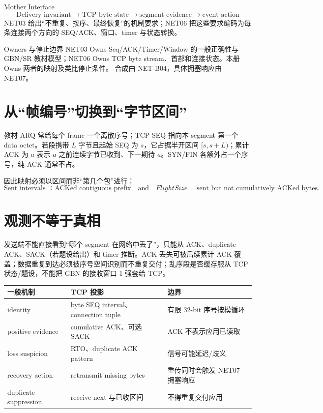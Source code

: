 \documentclass[UTF8,fontset=none,11pt,a4paper]{ctexart}
\begin{document}

\begin{corebox}{Mother Interface}
\[
\boxed{\text{Delivery invariant}\to\text{TCP byte-state}\to\text{segment evidence}\to\text{event action}}
\]
NET03 给出“不重复、按序、最终恢复”的机制要求；NET06 把这些要求编码为每条连接两个方向的 SEQ/ACK、窗口、timer 与状态转换。
\end{corebox}

\begin{methodbox}{Owners 与停止边界}
NET03 Owns Seq/ACK/Timer/Window 的一般正确性与 GBN/SR 教材模型；NET06 Owns TCP byte stream、首部和连接状态。本册 Owns 两者的映射及类比停止条件。 合成由 NET-B04，具体拥塞响应由 NET07。
\end{methodbox}

\section{从“帧编号”切换到“字节区间”}

教材 ARQ 常给每个 frame 一个离散序号；TCP SEQ 指向本 segment 第一个 data octet。若段携带 $L$ 字节且起始 SEQ 为 $s$，它占据半开区间 $[s,s+L)$；累计 ACK 为 $a$ 表示 $a$ 之前连续字节已收到、下一期待 $a$。SYN/FIN 各额外占一个序号，纯 ACK 通常不占。

因此映射必须以区间而非“第几个包”进行：
\[
\boxed{\text{Sent intervals}\supseteq\text{ACKed contiguous prefix}\quad\text{and}\quad
FlightSize=\text{sent but not cumulatively ACKed bytes}.}
\]

\section{观测不等于真相}

发送端不能直接看到“哪个 segment 在网络中丢了”，只能从 ACK、duplicate ACK、SACK（若题设给出）和 timer 推断。ACK 丢失可被后续累计 ACK 覆盖；数据重复到达必须被序号空间识别而不重复交付；乱序段是否缓存服从 TCP 状态/题设，不能把 GBN 的接收窗口 1 强套给 TCP。

\begin{center}\small
\begin{tabularx}{\linewidth}{L{2.4cm}Y Y}
\toprule
一般机制 & TCP 投影 & 边界\\
\midrule
identity & byte SEQ interval、connection tuple & 有限 32-bit 序号按模循环\\
positive evidence & cumulative ACK、可选 SACK & ACK 不表示应用已读取\\
loss suspicion & RTO、duplicate ACK pattern & 信号可能延迟/歧义\\
recovery action & retransmit missing bytes & 重传同时会触发 NET07 拥塞响应\\
duplicate suppression & receive-next 与已收区间 & 不得重复交付应用\\
\bottomrule
\end{tabularx}
\end{center}
\end{document}
